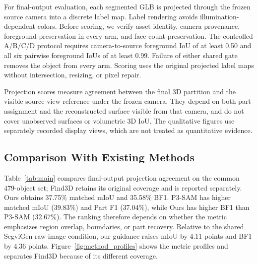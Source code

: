 \documentclass[pdflatex,iicol,sn-apa]{sn-jnl}
\begin{document}
For final-output evaluation, each segmented GLB is projected through the frozen source camera into a discrete label map. Label rendering avoids illumination-dependent colors. Before scoring, we verify asset identity, camera provenance, foreground preservation in every arm, and face-count preservation. The controlled A/B/C/D protocol requires camera-to-source foreground IoU of at least 0.50 and all six pairwise foreground IoUs of at least 0.99. Failure of either shared gate removes the object from every arm. Scoring uses the original projected label maps without intersection, resizing, or pixel repair.

Projection scores measure agreement between the final 3D partition and the visible source-view reference under the frozen camera. They depend on both part assignment and the reconstructed surface visible from that camera, and do not cover unobserved surfaces or volumetric 3D IoU. The qualitative figures use separately recorded display views, which are not treated as quantitative evidence.

\subsection{Comparison With Existing Methods}

Table~\ref{tab:main} compares final-output projection agreement on the common 479-object set; Find3D retains its original coverage and is reported separately. Ours obtains 37.75\% matched mIoU and 35.58\% BF1. P3-SAM has higher matched mIoU (39.83\%) and Part F1 (37.04\%), while Ours has higher BF1 than P3-SAM (32.67\%). The ranking therefore depends on whether the metric emphasizes region overlap, boundaries, or part recovery. Relative to the shared SegviGen raw-image condition, our guidance raises mIoU by 4.11 points and BF1 by 4.36 points. Figure~\ref{fig:method_profiles} shows the metric profiles and separates Find3D because of its different coverage.
\end{document}
